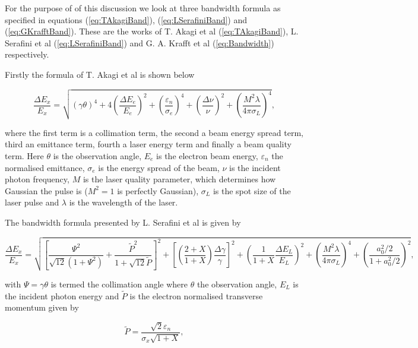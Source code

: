 \documentclass[11pt]{article}
\begin{document}
For the purpose of of this discussion we look at three bandwidth formula as specified in equations (\ref{eq:TAkagiBand}), (\ref{eq:LSerafiniBand}) and (\ref{eq:GKrafftBand}). These are the works of T. Akagi et al \cite{TAkagicERL} (\ref{eq:TAkagiBand}), L. Serafini et al \cite{SerafiniAnalytical}(\ref{eq:LSerafiniBand}) and G. A. Krafft et al \cite{KrafftBand} (\ref{eq:Bandwidth}) respectively.

Firstly the formula of T. Akagi et al is shown below    

\begin{equation}
\frac{\Delta E_{x}}{E_{x}} = \sqrt{\left(\gamma\theta\right)^{4}+4\left(\frac{\Delta E_{e}}{E_{e}}\right)^{2}+\left(\frac{\varepsilon_{n}}{\sigma_{e}}\right)^{4}+\left(\frac{\Delta \nu}{\nu}\right)^{2}+\left(\frac{M^{2}\lambda}{4\pi\sigma_{L}}\right)^{4}},
\label{eq:TAkagiBand}
\end{equation}

\noindent where the first term is a collimation term, the second a beam energy spread term, third an emittance term, fourth a laser energy term and finally a beam quality term. Here $\theta$ is the observation angle, $E_{e}$ is the electron beam energy, $\varepsilon_{n}$ the normalised emittance, $\sigma_{e}$ is the energy spread of the beam, $\nu$ is the incident photon frequency, $M$ is the laser quality parameter, which determines how Gaussian the pulse is ($M^{2} = 1$ is perfectly Gaussian), $\sigma_{L}$ is the spot size of the laser pulse and $\lambda$ is the wavelength of the laser.

The bandwidth formula presented by L. Serafini et al is given by

\begin{equation}
\frac{\Delta E_{x}}{E_{x}} = \sqrt{\left[\frac{\Psi^{2}}{\sqrt{12}\left(1+\Psi^{2}\right)}+\frac{\tilde{P}^{2}}{1+\sqrt{12}\tilde{P}}\right]^{2}+\left[\left(\frac{2+X}{1+X}\right)\frac{\Delta\gamma}{\gamma}\right]^{2}+\left(\frac{1}{1+X}\frac{\Delta E_{L}}{E_{L}}\right)^{2}+\left(\frac{M^{2}\lambda}{4\pi\sigma_{L}}\right)^{4}+\left(\frac{a^{2}_{0}/2}{1+a^{2}_{0}/2}\right)^{2}},
\label{eq:LSerafiniBand}
\end{equation}

\noindent with $\Psi = \gamma\theta$ is termed the collimation angle where $\theta$ the observation angle, $E_{L}$ is the incident photon energy and $\tilde{P}$ is the electron normalised transverse momentum given by

\begin{equation}
\tilde{P} = \frac{\sqrt{2}\varepsilon_{n}}{\sigma_{x}\sqrt{1+X}},
\label{eq:Pserf}
\end{equation}
\end{document}
